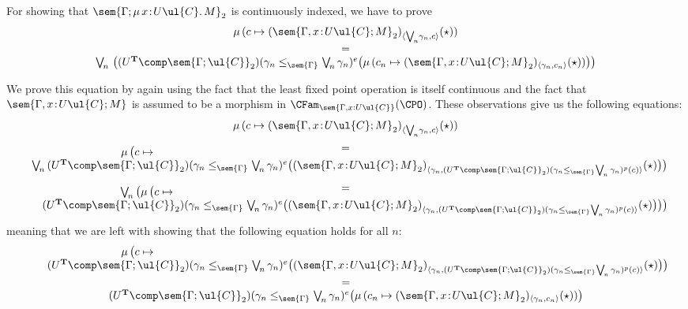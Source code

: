 For showing that $\sem{\Gamma; \mu\, x \!:\! U\ul{C} .\, M}_2$ is continuously indexed, we have to prove  
\[
\begin{array}{c}
\mu\, (c \mapsto (\sem{\Gamma, x \!:\! U\ul{C};M}_2)_{\langle \bigvee_{\!n}\! \gamma_n , c \rangle}(\star))
\\
=
\\
\bigvee_{\!n}\, \big((U^{\mathbf{T}} \comp \sem{\Gamma;\ul{C}}_2)(\gamma_n \leq_{\sem{\Gamma}} \bigvee_{\!n} \gamma_n)^e\big(\mu\, (c_n \mapsto (\sem{\Gamma, x \!:\! U\ul{C};M}_2)_{\langle \gamma_n , c_n \rangle}(\star))\big)\big)
\end{array}
\]

We prove this equation by again using the fact that the least fixed point operation is itself continuous and the fact that $\sem{\Gamma, x \!:\! U\ul{C};M}$ is assumed to be a morphism in $\CFam_{\sem{\Gamma, x : U\ul{C}}}(\CPO)$. These observations give us the following equations:
\[
\begin{array}{c}
\mu\, (c \mapsto (\sem{\Gamma, x \!:\! U\ul{C};M}_2)_{\langle \bigvee_{\!n}\! \gamma_n , c \rangle}(\star))
\\[3mm]
=
\\[-3mm]
\hspace{-13.25cm}
\mu\, \big(c \mapsto 
\\
\hspace{0.25cm}
\bigvee_{\!n}\, (U^{\mathbf{T}} \comp \sem{\Gamma;\ul{C}}_2)(\gamma_n \leq_{\sem{\Gamma}} \bigvee_{\!n} \gamma_n)^e\big((\sem{\Gamma, x \!:\! U\ul{C};M}_2)_{\langle \gamma_n , (U^{\mathbf{T}} \comp \sem{\Gamma;\ul{C}}_2)(\gamma_n \leq_{\sem{\Gamma}} \bigvee_{\!n} \gamma_n)^p(c) \rangle}(\star)\big)\big)
\\[3mm]
=
\\[-3mm]
\hspace{-12.65cm}
\bigvee_{\!n} \big(\mu\, \big(c \mapsto 
\\
\hspace{0.6cm}
(U^{\mathbf{T}} \comp \sem{\Gamma;\ul{C}}_2)(\gamma_n \leq_{\sem{\Gamma}} \bigvee_{\!n} \gamma_n)^e\big((\sem{\Gamma, x \!:\! U\ul{C};M}_2)_{\langle \gamma_n , (U^{\mathbf{T}} \comp \sem{\Gamma;\ul{C}}_2)(\gamma_n \leq_{\sem{\Gamma}} \bigvee_{\!n} \gamma_n)^p(c) \rangle}(\star)\big)\big)\big)
\end{array}
\]
meaning that we are left with showing that the following equation holds for all $n$:
\[
\begin{array}{c}
\hspace{-13.25cm}
\mu\, \big(c \mapsto 
\\
\hspace{0.75cm}
(U^{\mathbf{T}} \comp \sem{\Gamma;\ul{C}}_2)(\gamma_n \leq_{\sem{\Gamma}} \bigvee_{\!n} \gamma_n)^e\big((\sem{\Gamma, x \!:\! U\ul{C};M}_2)_{\langle \gamma_n , (U^{\mathbf{T}} \comp \sem{\Gamma;\ul{C}}_2)(\gamma_n \leq_{\sem{\Gamma}} \bigvee_{\!n} \gamma_n)^p(c) \rangle}(\star)\big)\big)
\\
=
\\
(U^{\mathbf{T}} \comp \sem{\Gamma;\ul{C}}_2)(\gamma_n \leq_{\sem{\Gamma}} \bigvee_{\!n} \gamma_n)^e\big(\mu\, (c_n \mapsto (\sem{\Gamma, x \!:\! U\ul{C};M}_2)_{\langle \gamma_n , c_n \rangle}(\star))\big)
\end{array}
\]

